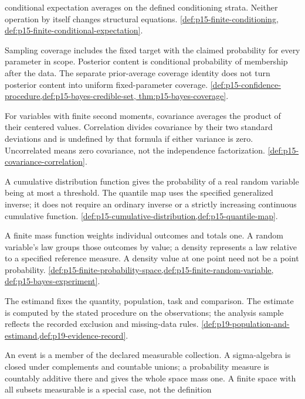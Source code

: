 \begin{description}[style=nextline,leftmargin=0pt]
conditional expectation averages on the defined conditioning strata.
Neither operation by itself changes structural equations.
\cref{def:p15-finite-conditioning,
def:p15-finite-conditional-expectation}.
\item[Confidence set; credible set.]
Sampling coverage includes the fixed target with the claimed probability
for every parameter in scope. Posterior content is conditional probability
of membership after the data. The separate prior-average coverage identity
does not turn posterior content into uniform fixed-parameter coverage.
\cref{def:p15-confidence-procedure,def:p15-bayes-credible-set,
thm:p15-bayes-coverage}.
\item[Covariance; correlation; uncorrelated.]
For variables with finite second moments, covariance averages the product
of their centered values. Correlation divides covariance by their two
standard deviations and is undefined by that formula if either variance
is zero. Uncorrelated means zero covariance, not the independence
factorization. \cref{def:p15-covariance-correlation}.
\item[Cumulative distribution function; quantile.]
A cumulative distribution function gives the probability of a real
random variable being at most a threshold. The quantile map uses the
specified generalized inverse; it does not require an ordinary inverse
or a strictly increasing continuous cumulative function.
\cref{def:p15-cumulative-distribution,def:p15-quantile-map}.
\item[Density; mass function; law.]
A finite mass function weights individual outcomes and totals one. A
random variable's law groups those outcomes by value; a density represents
a law relative to a specified reference measure. A density value at one
point need not be a point probability.
\cref{def:p15-finite-probability-space,def:p15-finite-random-variable,
def:p15-bayes-experiment}.
\item[Estimate; estimand; analysis sample.]
The estimand fixes the quantity, population, task and comparison. The
estimate is computed by the stated procedure on the observations; the
analysis sample reflects the recorded exclusion and missing-data rules.
\cref{def:p19-population-and-estimand,def:p19-evidence-record}.
\item[Event; sigma-algebra; probability space.]
An event is a member of the declared measurable collection. A sigma-algebra
is closed under complements and countable unions; a probability measure
is countably additive there and gives the whole space mass one. A finite
space with all subsets measurable is a special case, not the definition

\end{description}
